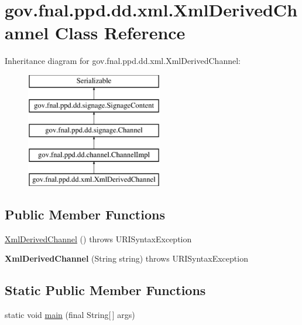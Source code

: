 \hypertarget{classgov_1_1fnal_1_1ppd_1_1dd_1_1xml_1_1XmlDerivedChannel}{\section{gov.\-fnal.\-ppd.\-dd.\-xml.\-Xml\-Derived\-Channel Class Reference}
\label{classgov_1_1fnal_1_1ppd_1_1dd_1_1xml_1_1XmlDerivedChannel}
}
Inheritance diagram for gov.\-fnal.\-ppd.\-dd.\-xml.\-Xml\-Derived\-Channel\-:\begin{figure}[H]
\begin{center}
\leavevmode
\includegraphics[height=5.000000cm]{classgov_1_1fnal_1_1ppd_1_1dd_1_1xml_1_1XmlDerivedChannel}
\end{center}
\end{figure}
\subsection*{Public Member Functions}
\begin{DoxyCompactItemize}
\item 
\hyperlink{classgov_1_1fnal_1_1ppd_1_1dd_1_1xml_1_1XmlDerivedChannel_a99604d4e33cb14128bdadbbeb26e961a}{Xml\-Derived\-Channel} ()  throws U\-R\-I\-Syntax\-Exception 
\item 
\hypertarget{classgov_1_1fnal_1_1ppd_1_1dd_1_1xml_1_1XmlDerivedChannel_a42743783587a2fcfe7ed1eebe5d04299}{{\bfseries Xml\-Derived\-Channel} (String string)  throws U\-R\-I\-Syntax\-Exception }\label{classgov_1_1fnal_1_1ppd_1_1dd_1_1xml_1_1XmlDerivedChannel_a42743783587a2fcfe7ed1eebe5d04299}

\end{DoxyCompactItemize}
\subsection*{Static Public Member Functions}
\begin{DoxyCompactItemize}
\item 
static void \hyperlink{classgov_1_1fnal_1_1ppd_1_1dd_1_1xml_1_1XmlDerivedChannel_a2c89f72f377c9a9c03cf16bef99efa8e}{main} (final String\mbox{[}$\,$\mbox{]} args)
\end{DoxyCompactItemize}
